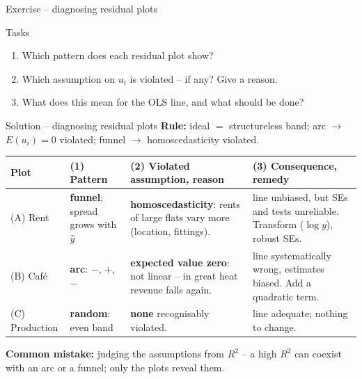 \documentclass[aspectratio=169,11pt]{beamer}
\begin{document}
\begin{frame}{Exercise -- diagnosing residual plots}
\begin{center}
  \end{center}
  \vspace{-12pt}
  \begin{exampleblock}{Tasks}
    \small
    \begin{enumerate}
      \setlength{\itemsep}{0pt}
      \item Which pattern does each residual plot show?
      \item Which assumption on $u_i$ is violated -- if any? Give a reason.
      \item What does this mean for the OLS line, and what should be done?
    \end{enumerate}
  \end{exampleblock}
\end{frame}

\begin{frame}{Solution -- diagnosing residual plots}
  \small \textbf{Rule:} ideal $=$ structureless band; arc $\to$ $E(u_i) = 0$
  violated; funnel $\to$ homoscedasticity violated.\par
  \footnotesize
  \begin{center}
    \renewcommand{\arraystretch}{1.0}
    \begin{tabular}{@{}>{\raggedright\arraybackslash}p{1.6cm}
                       >{\raggedright\arraybackslash}p{2.3cm}
                       >{\raggedright\arraybackslash}p{5.0cm}
                       >{\raggedright\arraybackslash}p{4.7cm}@{}}
      \toprule
      \textbf{Plot} & \textbf{(1) Pattern} & \textbf{(2) Violated assumption, reason} & \textbf{(3) Consequence, remedy} \\
      \midrule
      (A) Rent & \textbf{funnel}: spread grows with $\hat{y}$
        & \textbf{homoscedasticity}: rents of large flats vary more
          (location, fittings).
        & line unbiased, but SEs and tests unreliable. Transform
          ($\log y$), robust SEs. \\
      (B) Caf\'e & \textbf{arc}: $-$, $+$, $-$
        & \textbf{expected value zero}: not linear -- in great heat revenue
          falls again.
        & line systematically wrong, estimates biased. Add a quadratic term. \\
      (C) Production & \textbf{random}: even band
        & \textbf{none} recognisably violated.
        & line adequate; nothing to change. \\
      \bottomrule
    \end{tabular}
  \end{center}
  \small
  \textcolor{hsbirot}{\textbf{Common mistake:}} judging the assumptions from
  $R^2$ -- a high $R^2$ can coexist with an arc or a funnel; only
  the plots reveal them.
\end{frame}
\end{document}

